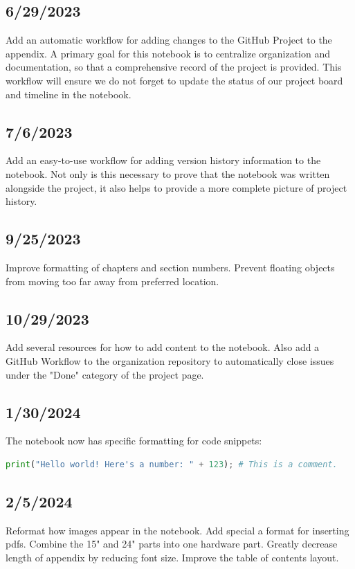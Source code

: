 \subsection{6/29/2023}
Add an automatic workflow for adding changes to the GitHub Project to the
appendix. A primary goal for this notebook is to centralize organization and
documentation, so that a comprehensive record of the project is provided. This
workflow will ensure we do not forget to update the status of our project board
and timeline in the notebook.
\subsection{7/6/2023}
Add an easy-to-use workflow for adding version history information to the
notebook. Not only is this necessary to prove that the notebook was written
alongside the project, it also helps to provide a more complete picture of
project history.
\subsection{9/25/2023}
Improve formatting of chapters and section numbers. Prevent floating objects
from moving too far away from preferred location.
\subsection{10/29/2023}
Add several resources for how to add content to the notebook. Also add a GitHub
Workflow to the organization repository to automatically close issues under the
"Done" category of the project page.
\subsection{1/30/2024}
The notebook now has specific formatting for code snippets:
\begin{lstlisting}[language=Python]
    print("Hello world! Here's a number: " + 123); # This is a comment.
\end{lstlisting}
\subsection{2/5/2024}
Reformat how images appear in the notebook. Add special a format for inserting
pdfs. Combine the 15" and 24" parts into one hardware part. Greatly decrease
length of appendix by reducing font size. Improve the table of contents layout.
